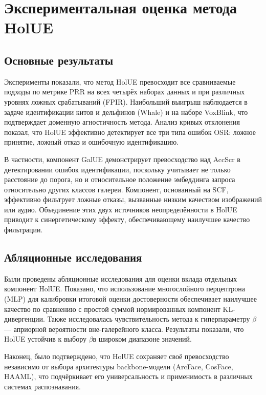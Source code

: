 \chapter{Экспериментальная оценка метода HolUE}\label{ch:experiments}

\section{Основные результаты}\label{sec:experiments/results}

Эксперименты показали, что метод HolUE превосходит все сравниваемые подходы по метрике PRR на всех четырёх наборах данных и при различных уровнях ложных срабатываний (FPIR).
Наибольший выигрыш наблюдается в задаче идентификации китов и дельфинов (Whale) и на наборе VoxBlink, что подтверждает доменную агностичность метода.
Анализ кривых отклонения показал, что HolUE эффективно детектирует все три типа ошибок OSR: ложное принятие, ложный отказ и ошибочную идентификацию.

В частности, компонент GalUE демонстрирует превосходство над AccScr в детектировании ошибок идентификации, поскольку учитывает не только расстояние до порога, но и относительное положение эмбеддинга запроса относительно других классов галереи.
Компонент, основанный на SCF, эффективно фильтрует ложные отказы, вызванные низким качеством изображений или аудио.
Объединение этих двух источников неопределённости в HolUE приводит к синергетическому эффекту, обеспечивающему наилучшее качество фильтрации.

\section{Абляционные исследования}\label{sec:experiments/ablation}

Были проведены абляционные исследования для оценки вклада отдельных компонент HolUE.
Показано, что использование многослойного перцептрона (MLP) для калибровки итоговой оценки достоверности обеспечивает наилучшее качество по сравнению с простой суммой нормированных компонент KL-дивергенции.
Также исследовалась чувствительность метода к гиперпараметру $\beta$ — априорной вероятности вне-галерейного класса. Результаты показали, что HolUE устойчив к выбору $\beta$в широком диапазоне значений.

Наконец, было подтверждено, что HolUE сохраняет своё превосходство независимо от выбора архитектуры backbone-модели (ArcFace, CosFace, HAAML), что подчёркивает его универсальность и применимость в различных системах распознавания.